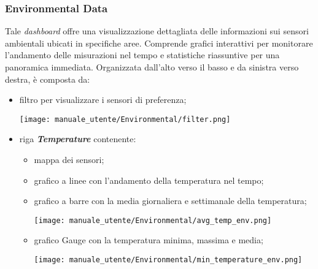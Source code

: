 \newpage
\subsubsection{Environmental Data}
Tale \textit{dashboard} offre una visualizzazione dettagliata delle informazioni sui sensori ambientali ubicati in specifiche aree. Comprende grafici interattivi per monitorare l'andamento delle misurazioni nel tempo e statistiche riassuntive per una panoramica immediata. Organizzata dall'alto verso il basso e da sinistra verso destra, è composta da:
\begin{itemize}
    \item filtro per visualizzare i sensori di preferenza;
    \begin{center}
        \texttt{[image: manuale\_utente/Environmental/filter.png]}
    \end{center}
    \item riga \textit{\textbf{Temperature}} contenente:
    \begin{itemize}
        \item mappa dei sensori; %
        \item grafico a linee con l'andamento della temperatura nel tempo; %
        \item grafico a barre con la media giornaliera e settimanale della temperatura;
        \begin{center}
            \texttt{[image: manuale\_utente/Environmental/avg\_temp\_env.png]}
        \end{center}
        \item grafico Gauge con la temperatura minima, massima e media;
        \begin{center}
            \texttt{[image: manuale\_utente/Environmental/min\_temperature\_env.png]}
        \end{center}
    \end{itemize}


\end{itemize}
